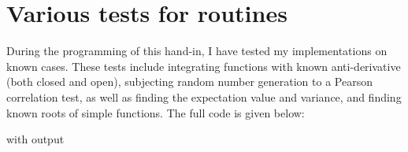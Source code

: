 \section{Various tests for routines}
During the programming of this hand-in, I have tested my implementations on known cases. These tests include integrating functions with known anti-derivative (both closed and open), subjecting random number generation to a Pearson correlation test, as well as finding the expectation value and variance, and finding known roots of simple functions. The full code is given below:

with output
